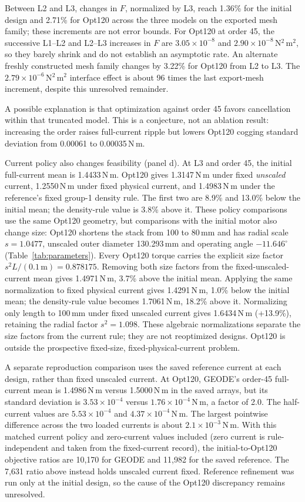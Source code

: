 \documentclass{anvil-paper}
\begin{document}
Between L2 and L3, changes in
$F$, normalized by L3, reach 1.36\% for the initial design and 2.71\%
for Opt120 across the three models on the exported mesh family; these increments are not error bounds.
For Opt120 at order 45, the successive L1--L2 and L2--L3 increases in $F$
are $3.05\times10^{-8}$ and $2.90\times10^{-8}$\,N$^2$\,m$^2$,
so they barely shrink and do not establish an asymptotic rate. An alternate
freshly constructed mesh family changes by 3.22\% for Opt120 from L2 to L3.
The $2.79\times10^{-6}$\,N$^2$\,m$^2$ interface effect is about
96 times the last export-mesh increment, despite this unresolved remainder.

A possible explanation is that optimization against order 45 favors
cancellation within that truncated model. This is a conjecture, not an
ablation result: increasing the order raises full-current ripple but
lowers Opt120 cogging standard deviation from 0.00061 to 0.00035\,N\,m.

Current policy also changes feasibility (panel d). At L3 and order 45,
the initial full-current mean is 1.4433\,N\,m. Opt120 gives 1.3147\,N\,m
under fixed \emph{unscaled} current, 1.2550\,N\,m under fixed physical
current, and 1.4983\,N\,m under the reference's fixed group-1 density rule.
The first two are 8.9\% and 13.0\% below the initial mean; the density-rule
value is 3.8\% above it. These policy comparisons use the same Opt120
geometry, but comparisons with the initial motor also change size:
Opt120 shortens the stack from 100 to 80\,mm and has radial scale
$s=1.0477$, unscaled outer diameter 130.293\,mm and operating angle
$-11.646^\circ$ (Table~\ref{tab:parameters}). Every Opt120 torque carries
the explicit size factor $s^2L/(0.1\,\mathrm{m})=0.878175$.
Removing both size factors from the fixed-unscaled-current mean gives
1.4971\,N\,m, 3.7\% above the initial mean. Applying the same normalization
to fixed physical current gives 1.4291\,N\,m, 1.0\% below the initial mean;
the density-rule value becomes 1.7061\,N\,m, 18.2\% above it. Normalizing
only length to 100\,mm under fixed unscaled current gives 1.6434\,N\,m
(+13.9\%), retaining the radial factor $s^2=1.098$.
These algebraic normalizations separate the size factors from the current
rule; they are not reoptimized designs. Opt120 is outside the prospective
fixed-size, fixed-physical-current problem.

A separate reproduction comparison uses the saved reference current at
each design, rather than fixed unscaled current. At Opt120, GEODE's
order-45 full-current mean is 1.4986\,N\,m versus 1.5000\,N\,m in the
saved arrays, but its standard deviation is $3.53\times10^{-4}$ versus
$1.76\times10^{-4}$\,N\,m, a factor of 2.0. The half-current values are
$5.53\times10^{-4}$ and $4.37\times10^{-4}$\,N\,m.
The largest pointwise difference across the two loaded currents is about
$2.1\times10^{-3}$\,N\,m. With this matched current policy and zero-current
values included (zero current is rule-independent and taken from the
fixed-current record), the initial-to-Opt120 objective ratios are 10,170 for
GEODE and 11,982 for the saved reference. The 7,631 ratio above instead
holds unscaled current fixed. Reference refinement was run only at the
initial design, so the cause of the Opt120 discrepancy remains unresolved.
\end{document}
